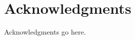 
\bigskip

\begingroup
\let\clearpage\relax
\let\cleardoublepage\relax
\let\cleardoublepage\relax
\chapter*{Acknowledgments}
Acknowledgments go here.

\endgroup



